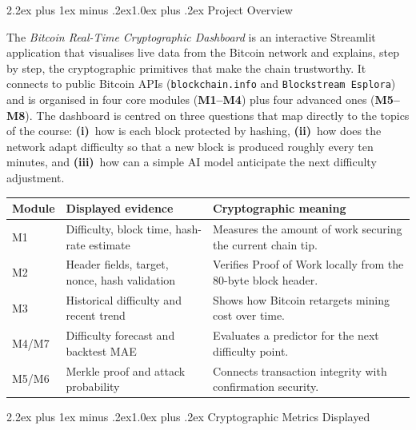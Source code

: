 \documentclass[11pt,a4paper]{article}
\makeatletter
\renewcommand{\section}{\@startsection{section}{1}{0pt}%
  {2.2ex plus 1ex minus .2ex}{1.0ex plus .2ex}%
  {\color{btcgreen}\large\bfseries\sffamily}}
\makeatother
\begin{document}
\begin{titlepage}
\vspace{0.6cm}
\end{titlepage}


\section{Project Overview}

The \emph{Bitcoin Real-Time Cryptographic Dashboard} is an interactive
Streamlit application that visualises live data from the Bitcoin network and
explains, step by step, the cryptographic primitives that make the chain
trustworthy. It connects to public Bitcoin APIs (\texttt{blockchain.info} and
\texttt{Blockstream Esplora}) and is organised in four core modules
(\textbf{M1--M4}) plus four advanced ones (\textbf{M5--M8}). The dashboard is
centred on three questions that map directly to the topics of the course:
\textbf{(i)}~how is each block protected by hashing,
\textbf{(ii)}~how does the network adapt difficulty so that a new block is
produced roughly every ten minutes, and
\textbf{(iii)}~how can a simple AI model anticipate the next difficulty
adjustment.

\begin{center}
\small
\renewcommand{\arraystretch}{1.2}
\begin{tabular}{@{}p{2.2cm}p{5.2cm}p{6.2cm}@{}}
\toprule
\textbf{Module} & \textbf{Displayed evidence} & \textbf{Cryptographic meaning} \\
\midrule
M1 & Difficulty, block time, hash-rate estimate & Measures the amount of work securing the current chain tip. \\
M2 & Header fields, target, nonce, hash validation & Verifies Proof of Work locally from the 80-byte block header. \\
M3 & Historical difficulty and recent trend & Shows how Bitcoin retargets mining cost over time. \\
M4/M7 & Difficulty forecast and backtest MAE & Evaluates a predictor for the next difficulty point. \\
M5/M6 & Merkle proof and attack probability & Connects transaction integrity with confirmation security. \\
\bottomrule
\end{tabular}
\end{center}

\section{Cryptographic Metrics Displayed}
\end{document}
